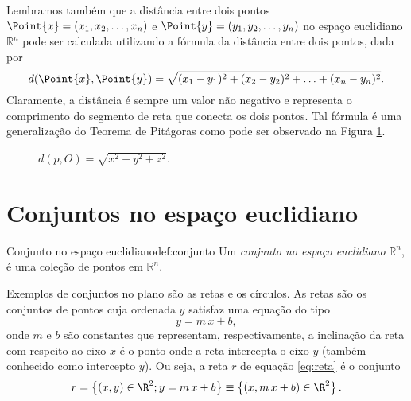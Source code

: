 Lembramos também que a distância entre dois pontos \(\Point{x}=(x_1, x_2, \ldots, x_n)\) e \(\Point{y}=(y_1, y_2, \ldots, y_n)\) no espaço euclidiano \(\mathbb{R}^n\) pode ser calculada utilizando a fórmula da distância entre dois pontos, dada por 
\[d(\Point{x},\Point{y}) = \sqrt{(x_1 - y_1)^2 + (x_2 - y_2)^2 + \ldots + (x_n - y_n)^2}.\] 
Claramente, a distância é sempre um valor não negativo e representa o comprimento do segmento de reta que conecta os dois pontos. Tal fórmula é uma generalização do Teorema de Pitágoras como pode ser observado na Figura \ref{exem:distancia}. 
\begin{figure}[!htb]
    \centering
\caption{$d(p,O)=\sqrt{x^2+y^2+z^2}$.}
\label{exem:distancia}
\end{figure}


\section{Conjuntos no espaço euclidiano}


\begin{definition}{Conjunto no espaço euclidiano}{def:conjunto}
Um \textit{conjunto no espaço euclidiano} \(\mathbb{R}^n\), é uma coleção de pontos em \(\mathbb{R}^n\). 
\end{definition}
Exemplos de conjuntos no plano são as retas e os círculos. As retas são os conjuntos de pontos cuja ordenada $y$ satisfaz uma equação do tipo
\begin{equation}\label{eq:reta}
    y=m\,x+b,
\end{equation}
onde $m$ e $b$ são constantes que representam, respectivamente, a inclinação da reta com respeito ao eixo $x$ é o ponto onde a reta intercepta o eixo $y$ (também conhecido como intercepto $y$). Ou seja, a reta $r$ de equação \eqref{eq:reta} é o conjunto
\[r=\left\{(x,y)\in \R^2; y=m\,x+b\right\}\equiv \left\{(x,m\,x+b)\in \R^2\right\}.\]

